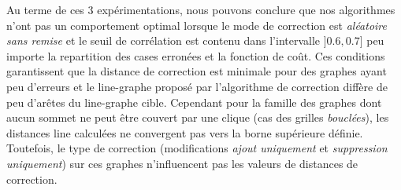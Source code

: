 Au terme de ces $3$ exp\'erimentations, nous pouvons conclure que nos algorithmes n'ont pas un comportement optimal lorsque le mode de correction est {\em al\'eatoire sans remise}  et le seuil de corr\'elation est contenu dans l'intervalle $]0.6,0.7]$ peu importe la repartition des cases erron\'ees et la fonction de co\^ut. 
Ces conditions garantissent que la distance de correction est minimale pour des graphes ayant peu d'erreurs et le line-graphe propos\'e par l'algorithme de correction diff\`ere de peu d'ar\^etes du line-graphe cible. 
 Cependant pour la famille des graphes dont aucun sommet ne peut \^etre couvert par une clique (cas des grilles {\em boucl\'ees}),  les distances line calcul\'ees ne convergent pas vers la borne sup\'erieure d\'efinie. Toutefois, le type de correction (modifications {\em ajout uniquement} et {\em suppression uniquement}) sur ces graphes n'influencent pas les valeurs de distances de correction. 


